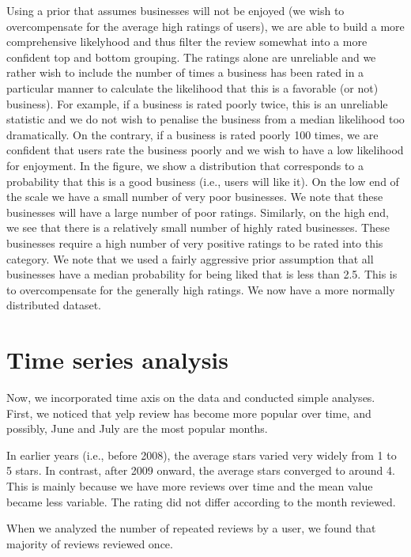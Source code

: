 \documentclass[11pt]{article}
\begin{document}
\par Using a prior that assumes businesses will not be enjoyed (we wish to overcompensate for the average high ratings of users), we are able to build a more comprehensive likelyhood and thus filter the review somewhat into a more confident top and bottom grouping. The ratings alone are unreliable and we rather wish to include the number of times a business has been rated in a particular manner to calculate the likelihood that this is a favorable (or not) business). For example, if a business is rated poorly twice, this is an unreliable statistic and we do not wish to penalise the business from a median likelihood too dramatically. On the contrary, if a business is rated poorly 100 times, we are confident that users rate the business poorly and we wish to have a low likelihood for enjoyment. In the figure, we show a distribution that corresponds to a probability that this is a good business (i.e., users will like it). On the low end of the scale we have a small number of very poor businesses. We note that these businesses will have a large number of poor ratings. Similarly, on the high end, we see that there is a relatively small number of highly rated businesses. These businesses require a high number of very positive ratings to be rated into this category. We note that we used a fairly aggressive prior assumption that all businesses have a median probability for being liked that is less than 2.5. This is to overcompensate for the generally high ratings. We now have a more normally distributed dataset.

\section*{Time series analysis}
Now, we incorporated time axis on the data and conducted simple analyses. First, we noticed that yelp review has become more popular over time, and possibly, June and July are the most popular months.

\par In earlier years (i.e., before 2008), the average stars varied very widely from 1 to 5 stars. In contrast, after 2009 onward, the average stars converged to around 4. This is mainly because we have more reviews over time and the mean value became less variable. The rating did not differ according to the month reviewed.

\par When we analyzed the number of repeated reviews by a user, we found that majority of reviews reviewed once.
\end{document}
